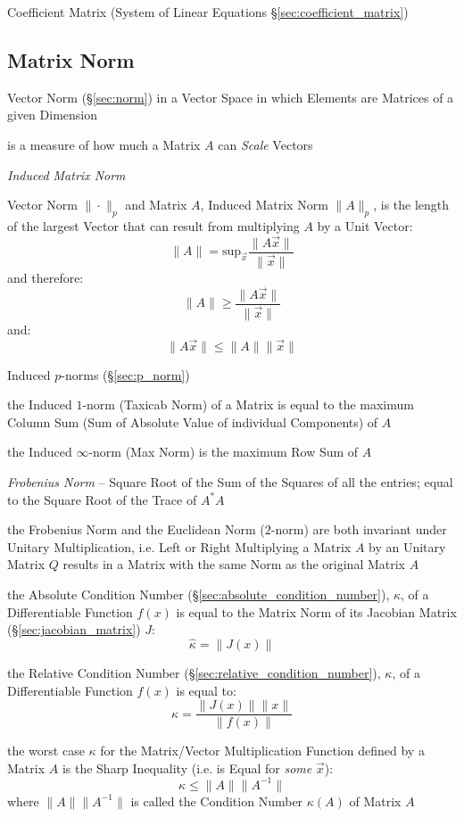 Coefficient Matrix (System of Linear Equations \S\ref{sec:coefficient_matrix})



\subsection{Matrix Norm}\label{sec:matrix_norm}

Vector Norm (\S\ref{sec:norm}) in a Vector Space in which Elements are Matrices
of a given Dimension

is a measure of how much a Matrix $A$ can \emph{Scale} Vectors

\emph{Induced Matrix Norm}

Vector Norm $\|\cdot\|_p$ and Matrix $A$, Induced Matrix Norm $\|A\|_p$, is the
length of the largest Vector that can result from multiplying $A$ by a Unit
Vector:
\[
  \|A\| = \mathrm{sup}_{\vec{x}} \frac{\|A\vec{x}\|}{\|\vec{x}\|}
\]
and therefore:
\[
  \|A\| \geq \frac{\|A\vec{x}\|}{\|\vec{x}\|}
\]
and:
\[
  \|A\vec{x}\| \leq \|A\| \|\vec{x}\|
\]

Induced $p$-norms (\S\ref{sec:p_norm})

the Induced $1$-norm (Taxicab Norm) of a Matrix is equal to the maximum Column
Sum (Sum of Absolute Value of individual Components) of $A$

the Induced $\infty$-norm (Max Norm) is the maximum Row Sum of $A$


\emph{Frobenius Norm} -- Square Root of the Sum of the Squares of all the
entries; equal to the Square Root of the Trace of $A^*A$


the Frobenius Norm and the Euclidean Norm ($2$-norm) are both invariant under
Unitary Multiplication, i.e. Left or Right Multiplying a Matrix $A$ by an
Unitary Matrix $Q$ results in a Matrix with the same Norm as the original
Matrix $A$

the Absolute Condition Number (\S\ref{sec:absolute_condition_number}),
$\hat{\kappa}$, of a Differentiable Function $f(x)$ is equal to the Matrix Norm
of its Jacobian Matrix (\S\ref{sec:jacobian_matrix}) $J$:
\[
  \hat{\kappa} = \|J(x)\|
\]

the Relative Condition Number (\S\ref{sec:relative_condition_number}),
$\kappa$, of a Differentiable Function $f(x)$ is equal to:
\[
  \kappa = \frac{\|J(x)\| \|x\|}{\|f(x)\|}
\]

the worst case $\kappa$ for the Matrix/Vector Multiplication Function defined
by a Matrix $A$ is the Sharp Inequality (i.e. is Equal for \emph{some}
$\vec{x}$):
\[
  \kappa \leq \|A\|\|A^{-1}\|
\]
where $\|A\|\|A^{-1}\|$ is called the Condition Number $\kappa(A)$ of Matrix
$A$




